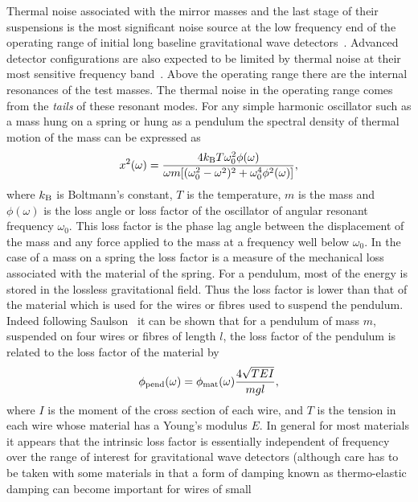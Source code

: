 \documentclass{article}
\begin{document}
Thermal noise associated with the mirror masses and the last stage of their
suspensions is the most significant noise source at the low frequency end of the
operating range of initial long baseline gravitational wave
detectors~\cite{Saulson2}. Advanced detector configurations are also expected to
be limited by thermal noise at their most sensitive frequency
band~\cite{Levin, Nakagawa:2002, Harry:2002, Crooks:2002}. Above the operating
range there are the internal resonances of the test masses. The thermal noise in
the operating range comes from the {\em tails} of these resonant modes. For any
simple harmonic oscillator such as a mass hung on a spring or hung as a pendulum
the spectral density of thermal motion of the mass can be expressed
as~\cite{Saulson2}
%
\begin{equation}
  x^{2}(\omega) = \frac{4 k_{\rm B} T \omega_{0}^{2}
  \phi(\omega)}{\omega m [{(\omega_{0}^{2} - \omega^{2})^2 +
  \omega_{0}^{4} \phi^{2}(\omega)}]},
  \label{equation:thnoise}
\end{equation}
%
where $k_{\rm B}$ is Boltmann's constant, $T$ is the temperature, $m$ is the
mass and  $\phi(\omega)$ is the loss angle or loss factor of the
oscillator of angular resonant frequency $\omega_0$. This loss factor is the
phase lag angle between the displacement of the mass and any force applied to
the mass at a frequency well below $\omega_0$. In the case of a mass on a spring
the loss factor is a measure of the mechanical loss associated with the material
of the spring. For a pendulum, most of the energy is stored in the lossless
gravitational field. Thus the loss factor is lower than that of the material
which is used for the wires or fibres used to suspend the pendulum. Indeed
following Saulson~\cite{Saulson2} it can be shown that for a pendulum of mass
$m$, suspended on four wires or fibres of length $l$, the loss factor of the
pendulum is related to the loss factor of the material by
%
\begin{equation}
  \phi_{\rm pend}(\omega) = \phi_{\rm mat}(\omega)\frac{4
  \sqrt{TEI}}{mgl},
  \label{equation:pend}
\end{equation}
%
where $I$ is the moment of the cross section of  each wire, and $T$ is the
tension in each wire whose material has a Young's modulus $E$. In general for
most materials it appears that the intrinsic loss factor is essentially
independent of frequency over the range of interest for gravitational wave
detectors (although care has to be taken with some materials in that a form of
damping known as thermo-elastic damping can become important for wires of small
\end{document}
